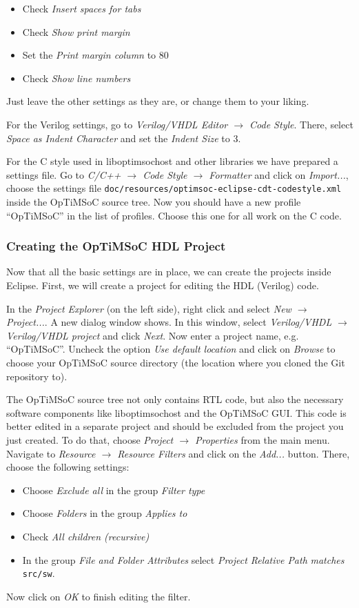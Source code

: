 \begin{itemize}
 \item Check \emph{Insert spaces for tabs}
 \item Check \emph{Show print margin}
 \item Set the \emph{Print margin column} to 80
 \item Check \emph{Show line numbers}
\end{itemize}

Just leave the other settings as they are, or change them to your liking.

For the Verilog settings, go to \emph{Verilog/VHDL Editor $\rightarrow$ Code
Style}. There, select \emph{Space as Indent Character} and set the \emph{Indent
Size} to 3.

For the C style used in liboptimsochost and other libraries we have prepared a
settings file. Go to \emph{C/C++ $\rightarrow$ Code Style $\rightarrow$
Formatter} and click on \emph{Import...}, choose the settings file
\verb|doc/resources/optimsoc-eclipse-cdt-codestyle.xml| inside the OpTiMSoC
source tree. Now you should have a new profile ``OpTiMSoC'' in the list of
profiles. Choose this one for all work on the C code.

\subsubsection{Creating the OpTiMSoC HDL Project}

Now that all the basic settings are in place, we can create the projects inside
Eclipse. First, we will create a project for editing the HDL (Verilog) code.

In the \emph{Project Explorer} (on the left side), right click and select
\emph{New $\rightarrow$ Project...}. A new dialog window shows. In this window,
select \emph{Verilog/VHDL $\rightarrow$ Verilog/VHDL project} and click
\emph{Next}. Now enter a project name, e.g. ``OpTiMSoC''. Uncheck the option
\emph{Use default location} and click on \emph{Browse} to choose your OpTiMSoC
source directory (the location where you cloned the Git repository to).

The OpTiMSoC source tree not only contains RTL code, but also the necessary
software components like liboptimsochost and the OpTiMSoC GUI. This code is
better edited in a separate project and should be excluded from the project you
just created. To do that, choose \emph{Project $\rightarrow$
Properties} from the main menu. Navigate to \emph{Resource $\rightarrow$
Resource Filters} and click on the \emph{Add...} button. There, choose the
following settings:
\begin{itemize}
 \item Choose \emph{Exclude all} in the group \emph{Filter type}
 \item Choose \emph{Folders} in the group \emph{Applies to}
 \item Check \emph{All children (recursive)}
 \item In the group \emph{File and Folder Attributes} select
\emph{Project Relative Path} \emph{matches} \verb|src/sw|.
\end{itemize}
Now click on \emph{OK} to finish editing the filter.

